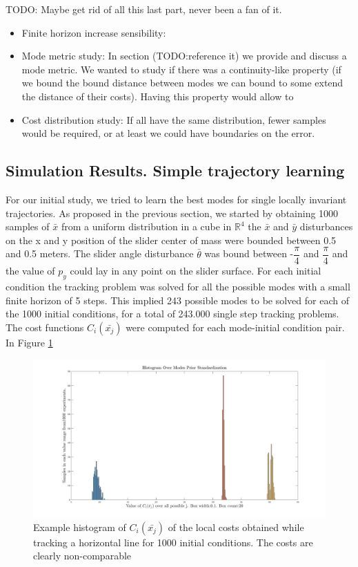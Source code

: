 \documentclass[12,twoside]{TFG-GM}
\theoremstyle{definition}
\theoremstyle{remark}
\newcommand*\diff[1]{\bar{#1}}
\begin{document}
TODO: Maybe get rid of all this last part, never been a fan of it.
\begin{itemize}
\item {Finite horizon increase sensibility:}
\item {Mode metric study:} In section (TODO:reference it) we provide and discuss a mode metric. We wanted to study if there was a continuity-like property (if we bound the bound distance between modes we can bound to some extend the distance of their costs). Having this property would allow to 
\item {Cost distribution study:} If all have the same distribution, fewer samples would be required, or at least we could have boundaries on the error.
\end{itemize}

\subsection{Simulation Results. Simple trajectory learning}
\label{subsec:learningsimple}
For our initial study, we tried to learn the best modes for single locally invariant trajectories. As proposed in the previous section, we started by obtaining 1000 samples of $\diff{x}$ from a uniform distribution in a cube in $\mathbb{R}^4$ the $\diff{x}$ and $\diff{y}$ disturbances on the x and y position of the slider center of mass were bounded between 0.5 and 0.5 meters. The slider angle disturbance $\diff{\theta}$ was bound between -$\dfrac{\pi}{4}$ and $\dfrac{\pi}{4}$ and the value of $p_y$ could lay in any point on the slider surface. For each initial condition the tracking problem was solved for all the possible modes with a small finite horizon of 5 steps. This implied 243 possible modes to be solved for each of the 1000 initial conditions, for a total of 243.000 single step tracking problems. The cost functions $C_i(\diff{x_j})$ were computed for each mode-initial condition pair. In Figure \ref{fig:hist_pre} 

\begin{figure}[htb!]
\begin{center}
\includegraphics[width=16cm]{hist_pre_std.jpg}
\end{center}
\caption{\label{fig:hist_pre} \small Example histogram of $C_i(\diff{x_j})$ of the local costs obtained while tracking a horizontal line for 1000 initial conditions. The costs are clearly non-comparable}
\end{figure}
\end{document}
